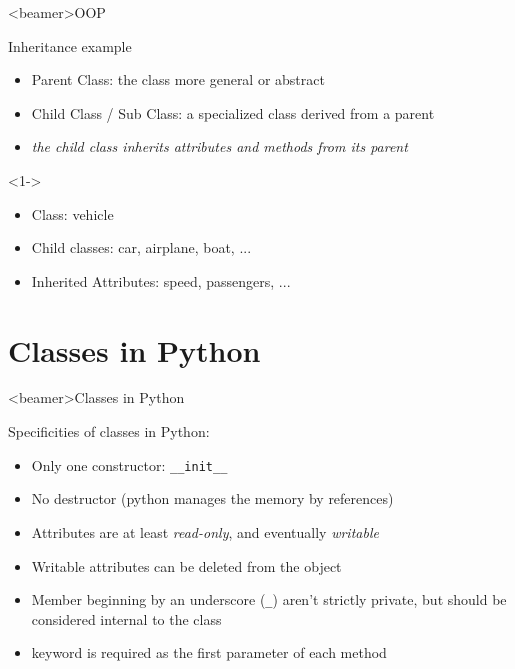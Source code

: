 
\begin{frame}<beamer>{OOP}

  Inheritance example

  \begin{itemize}
    \item<1-> Parent Class: the class more general or abstract
    \item<1-> Child Class / Sub Class: a specialized class derived from a parent
    \item<1-> \textit{the child class inherits attributes and methods from its parent}
  \end{itemize}

  \begin{onlyenv}<1->
    \vspace*{1cm}
  \end{onlyenv}

  \begin{itemize}
    \item<2-> Class: vehicle
    \item<3-> Child classes: car, airplane, boat, ...
    \item<4-> Inherited Attributes: speed, passengers, ...
  \end{itemize}

\end{frame}



\section{Classes in Python}

\begin{frame}<beamer>{Classes in Python}

  Specificities of classes in Python:

  \begin{itemize}
    \item<2-> Only one constructor: \lstinline|__init__|
    \item<3-> No destructor (python manages the memory by references)
    \item<4-> Attributes are at least \textit{read-only}, and eventually \textit{writable}
    \item<5-> Writable attributes can be deleted from the object
    \item<6-> Member beginning by an underscore (\lstinline|_|) aren't strictly private, but should be considered internal to the class
    \item<7->  keyword is required as the first parameter of each method
  \end{itemize}

\end{frame}

